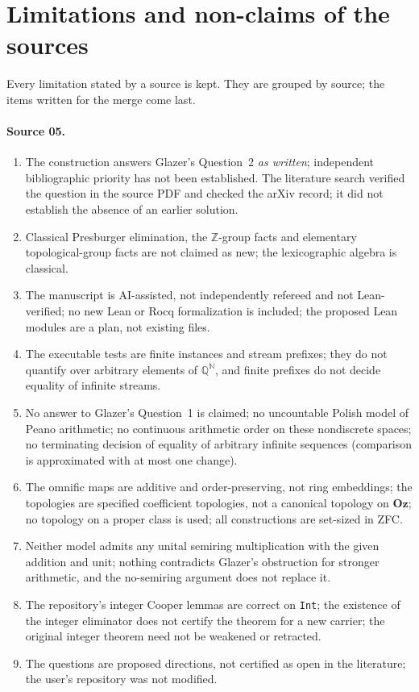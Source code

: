 \documentclass[11pt]{article}
\numberwithin{equation}{section}
\theoremstyle{definition}
\theoremstyle{remark}
\newcommand{\N}{\mathbb N}
\newcommand{\Z}{\mathbb Z}
\newcommand{\Q}{\mathbb Q}
\newcommand{\Oz}{\mathbf{Oz}}
\begin{document}
\section{Limitations and non-claims of the sources}\label{pma:app:nonclaims}

Every limitation stated by a source is kept. They are grouped by source; the
items written for the merge come last.

\paragraph{Source 05.}
\begin{enumerate}[label=05.\arabic*]
\item The construction answers Glazer's Question~2 \emph{as written};
independent bibliographic priority has not been established. The literature
search verified the question in the source PDF and checked the arXiv record;
it did not establish the absence of an earlier solution.
\item Classical Presburger elimination, the $\Z$-group facts and elementary
topological-group facts are not claimed as new; the lexicographic algebra is
classical.
\item The manuscript is AI-assisted, not independently refereed and not
Lean-verified; no new Lean or Rocq formalization is included; the proposed
Lean modules are a plan, not existing files.
\item The executable tests are finite instances and stream prefixes; they do
not quantify over arbitrary elements of $\Q^{\N}$, and finite prefixes do not
decide equality of infinite streams.
\item No answer to Glazer's Question~1 is claimed; no uncountable Polish model
of Peano arithmetic; no continuous arithmetic order on these nondiscrete
spaces; no terminating decision of equality of arbitrary infinite sequences
(comparison is approximated with at most one change).
\item The omnific maps are additive and order-preserving, not ring
embeddings; the topologies are specified coefficient topologies, not a
canonical topology on $\Oz$; no topology on a proper class is used; all
constructions are set-sized in ZFC.
\item Neither model admits any unital semiring multiplication with the given
addition and unit; nothing contradicts Glazer's obstruction for stronger
arithmetic, and the no-semiring argument does not replace it.
\item The repository's integer Cooper lemmas are correct on \texttt{Int}; the
existence of the integer eliminator does not certify the theorem for a new
carrier; the original integer theorem need not be weakened or retracted.
\item The questions are proposed directions, not certified as open in the
literature; the user's repository was not modified.
\end{enumerate}
\end{document}

